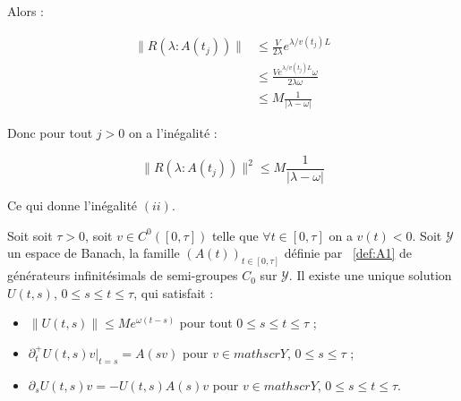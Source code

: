 \documentclass[a4paper]{article}
\begin{document}
\begin{preuve}
	Alors :
	
	\[
	\begin{split}
		\displaystyle \|R(\lambda:A(t_j)) \| &\leq  \frac{V}{2\lambda} e^{\lambda/v(t_j)L}\\
		                                     &\leq \frac{ V e^{\lambda/v(t_j)L} \omega}{2\lambda \omega}\\
											 &\leq M \frac{1}{|\lambda - \omega|}
	\end{split}
	\]
	
 	Donc pour tout $j>0$ on a l'inégalité :
	
 	\begin{equation}
 		\displaystyle \|R(\lambda:A(t_j)) \|^2 \leq M \frac{1}{|\lambda - \omega|}
 	\end{equation}
	
	Ce qui donne l'inégalité $(ii)$.
\end{preuve}

\begin{proposition}
	\label{prop:cas1}
	Soit soit $\tau>0$, soit $v \in C^0([0,\tau])$ telle que $\forall t \in [0,\tau]$ on a $v(t)<0$.
	Soit $\mathscr{Y}$ un espace de Banach, la famille $(A(t))_{t \in [0,\tau]}$ 
	définie par ~\eqref{def:A1}
	de générateurs infinitésimals de semi-groupes $C_0$ sur $\mathscr{Y}$.
	Il existe une unique solution $U(t,s)$, $0\leq s \leq t \leq \tau $, qui satisfait :
	\begin{itemize}
		\item $\|U(t,s)\| \leq M e^{\omega(t-s)}$ pour tout $0\leq s \leq t\leq \tau$ ;
		\item $\partial_t^+ U(t,s)v|_{t=s} = A(sv)$ pour $v\in mathscr{Y}$, $0\leq s\leq \tau$ ;
		\item $\partial_s U(t,s)v = - U(t,s)A(s)v$ pour $v\in mathscr{Y}$, $0\leq s\leq t\leq \tau$.
	\end{itemize}
\end{proposition}
\end{document}

